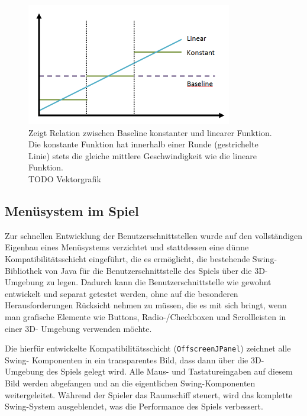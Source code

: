 \documentclass[a4paper,12pt]{scrartcl}
\begin{document}
\begin{figure}[htp]
\begin{center}
  \includegraphics[width=0.8\textwidth]{SessionTypen.png}
  \caption[Vergleich der Geschwindigkeitsfunktionen]{Zeigt Relation zwischen
  Baseline konstanter und linearer Funktion. Die konstante Funktion hat innerhalb einer Runde (gestrichelte Linie) stets die gleiche
mittlere Geschwindigkeit wie die lineare Funktion.\\
  TODO Vektorgrafik}
  \label{fig:SessionTypen}
\end{center}
\end{figure} 

\subsection{Menüsystem im Spiel}
Zur schnellen Entwicklung der Benutzerschnittstellen wurde auf den
vollständigen Eigenbau eines Menüsystems verzichtet und stattdessen eine dünne Kompatibilitätsschicht
eingeführt, die es ermöglicht, die bestehende Swing-Bibliothek von Java für die
Benutzerschnittstelle des Spiels über die 3D-Umgebung zu legen. Dadurch kann die
Benutzerschnittstelle wie gewohnt entwickelt und separat getestet werden, ohne auf die
besonderen Herausforderungen Rücksicht nehmen zu müssen, die es mit sich bringt, wenn
man grafische Elemente wie Buttons, Radio-/Checkboxen und Scrollleisten in einer 3D-
Umgebung verwenden möchte.

Die hierfür entwickelte Kompatibilitätsschicht (\texttt{OffscreenJPanel})
zeichnet alle Swing- Komponenten in ein transparentes Bild, dass dann über die 3D-Umgebung des Spiels
gelegt wird. Alle Maus- und Tastatureingaben auf diesem Bild werden abgefangen und an
die eigentlichen Swing-Komponenten weitergeleitet. Während der Spieler das Raumschiff
steuert, wird das komplette Swing-System ausgeblendet, was die Performance des Spiels
verbessert.
\end{document}
